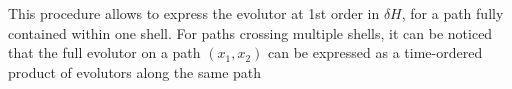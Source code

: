 \documentclass[11pt,a4paper]{article}
\newcommand{\de}[0]{\text{d}}
\begin{document}
%
%
This procedure allows to express the evolutor at 1st order in $\delta H$, for a path fully contained within one shell. For paths crossing multiple shells, it can be noticed~\cite{Lisi:1997yc} that the full evolutor on a path $(x_1,x_2)$ can be expressed as a time-ordered product of evolutors along the same path
\end{document}

